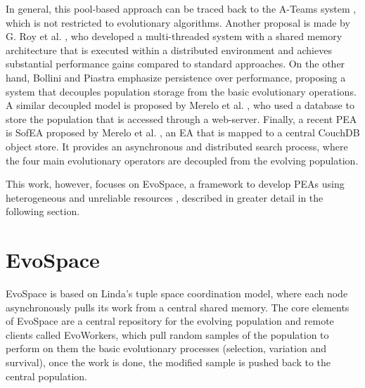 \documentclass{sig-alternate}
\begin{document}

In general, this pool-based approach can be traced back to the A-Teams system \cite{ateam}, which is not restricted to evolutionary algorithms.
Another proposal is made by G. Roy et al. \cite{roy:2009}, who developed a multi-threaded system with a shared memory architecture that is
executed within a distributed environment and achieves substantial performance gains compared to standard approaches. On the other hand, Bollini and Piastra \cite{bollini:1999} emphasize persistence over performance, proposing a system that decouples population storage from the basic evolutionary operations. A similar decoupled model is proposed by Merelo et al. \cite{merelo:2008}, who used a database to store the population that is accessed through a web-server. Finally, a recent PEA is SofEA proposed by Merelo et al. \cite{sofea1,sofea2},
an EA that is mapped to a central CouchDB object store. It provides an asynchronous and distributed search process, where the four main evolutionary operators are decoupled from the evolving population.

This work, however, focuses on EvoSpace, a framework to develop PEAs using heterogeneous and unreliable resources \cite{Evospace,Musart,FreeLunch,Fire}, described in greater
detail in the following section.
 
\section{EvoSpace}
\label{sec:evo}
EvoSpace is based on Linda's tuple space \cite{Evospace} coordination model, where each node asynchronously
pulls its work from a central shared memory. The core elements of EvoSpace are a central 
repository for the evolving population and remote clients called EvoWorkers,
which pull random samples of the population to perform on them the basic evolutionary
processes (selection, variation and survival), once the work is done, the modified sample is pushed back to the central population.
\end{document}
